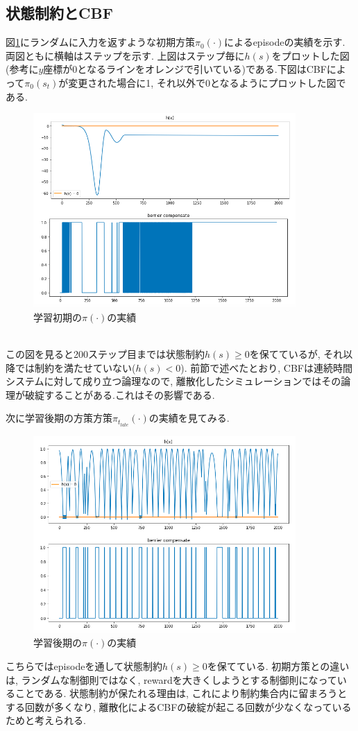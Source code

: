 \documentclass{jsarticle}
\begin{document}
\subsection{状態制約とCBF}
図\ref{init}にランダムに入力を返すような初期方策$\pi_0(\cdot)$によるepisodeの実績を示す. 両図ともに横軸はステップを示す. 上図はステップ毎に$h(s)$をプロットした図(参考に$y$座標が0となるラインをオレンジで引いている)である.下図はCBFによって$\pi_0(s_t)$が変更された場合に1, それ以外で0となるようにプロットした図である.
\begin{figure}[h]
	\centering
 	\includegraphics[width=10cm]{initial_policy.png}
 	\caption{学習初期の$\pi(\cdot)$の実績} \label{init}
\end{figure}\\

この図を見ると200ステップ目までは状態制約$h(s)\geq 0$を保てているが, それ以降では制約を満たせていない($h(s)<0$). 前節で述べたとおり, CBFは連続時間システムに対して成り立つ論理なので, 離散化したシミュレーションではその論理が破綻することがある.これはその影響である. \par

次に学習後期の方策方策$\pi_{t_{late}}(\cdot)$の実績を見てみる. 
\begin{figure}[h]
	\centering
 	\includegraphics[width=10cm]{good_policy.png}
 	\caption{学習後期の$\pi(\cdot)$の実績}
\end{figure}\par
こちらではepisodeを通して状態制約$h(s)\geq 0$を保てている. 初期方策との違いは, ランダムな制御則ではなく, rewardを大きくしようとする制御則になっていることである. 状態制約が保たれる理由は, これにより制約集合内に留まろうとする回数が多くなり, 離散化によるCBFの破綻が起こる回数が少なくなっているためと考えられる.\par
\end{document}
